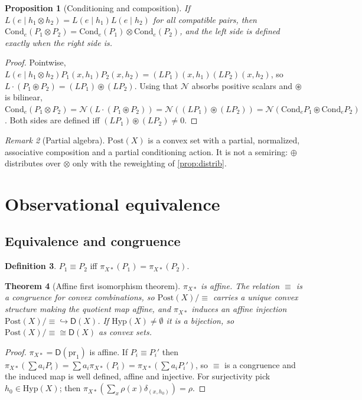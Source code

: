 \documentclass[11pt]{article}
\newtheorem{theorem}{Theorem}[section]
\newtheorem{proposition}[theorem]{Proposition}
\theoremstyle{definition}
\newtheorem{definition}[theorem]{Definition}
\theoremstyle{remark}
\newtheorem{remark}[theorem]{Remark}
\newcommand{\D}{\mathsf{D}}
\newcommand{\Hyp}{\mathrm{Hyp}}
\newcommand{\Post}{\mathrm{Post}}
\newcommand{\Cond}{\mathrm{Cond}}
\newcommand{\N}{\mathcal{N}}
\newcommand{\cp}{\circledast}
\begin{document}
\begin{proposition}[Conditioning and composition]\label{prop:cond-comp}
If $L(e\mid h_1\otimes h_2)=L(e\mid h_1)L(e\mid h_2)$ for all compatible pairs, then
$\Cond_e(P_1\otimes P_2)=\Cond_e(P_1)\otimes\Cond_e(P_2)$, and the left side is defined exactly when
the right side is.
\end{proposition}
\begin{proof}
Pointwise, $L(e\mid h_1\otimes h_2)P_1(x,h_1)P_2(x,h_2)=(LP_1)(x,h_1)(LP_2)(x,h_2)$, so
$L\cdot(P_1\cp P_2)=(LP_1)\cp(LP_2)$. Using that $\N$ absorbs positive scalars and $\cp$ is
bilinear, $\Cond_e(P_1\otimes P_2)=\N(L\cdot(P_1\cp P_2))=\N((LP_1)\cp(LP_2))
=\N(\Cond_eP_1\cp\Cond_eP_2)$. Both sides are defined iff $(LP_1)\cp(LP_2)\ne0$.
\end{proof}

\begin{remark}[Partial algebra]
$\Post(X)$ is a convex set with a partial, normalized, associative composition and a partial
conditioning action. It is not a semiring: $\oplus$ distributes over $\otimes$ only with the
reweighting of \cref{prop:distrib}.
\end{remark}

\section{Observational equivalence}\label{sec:obs}

\subsection{Equivalence and congruence}

\begin{definition}
$P_1\equiv P_2$ iff $\pi_{X*}(P_1)=\pi_{X*}(P_2)$.
\end{definition}

\begin{theorem}[Affine first isomorphism theorem]\label{thm:firstiso}
$\pi_{X*}$ is affine. The relation $\equiv$ is a congruence for convex combinations, so
$\Post(X)/{\equiv}$ carries a unique convex structure making the quotient map affine, and
$\pi_{X*}$ induces an affine injection $\Post(X)/{\equiv}\hookrightarrow\D(X)$. If
$\Hyp(X)\neq\emptyset$ it is a bijection, so $\Post(X)/{\equiv}\cong\D(X)$ as convex sets.
\end{theorem}
\begin{proof}
$\pi_{X*}=\D(\mathrm{pr}_1)$ is affine. If $P_i\equiv P_i'$ then
$\pi_{X*}(\sum a_iP_i)=\sum a_i\pi_{X*}(P_i)=\pi_{X*}(\sum a_iP_i')$, so $\equiv$ is a congruence and
the induced map is well defined, affine and injective. For surjectivity pick $h_0\in\Hyp(X)$; then
$\pi_{X*}(\sum_x\rho(x)\delta_{(x,h_0)})=\rho$.
\end{proof}
\end{document}
